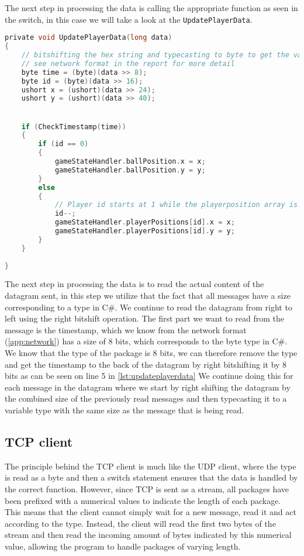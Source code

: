 The next step in processing the data is calling the appropriate function as seen in the switch, in this case we will take a look at the \texttt{UpdatePlayerData}.

\begin{lstlisting}[caption={Updating player data in UDP client}, captionpos=b,language=C,label={lst:updateplayerdata}]
private void UpdatePlayerData(long data)
{
    // bitshifting the hex string and typecasting to byte to get the values.
    // see network format in the report for more detail
    byte time = (byte)(data >> 8);
    byte id = (byte)(data >> 16);
    ushort x = (ushort)(data >> 24);
    ushort y = (ushort)(data >> 40);


    if (CheckTimestamp(time))
    {
        if (id == 0)
        {
            gameStateHandler.ballPosition.x = x;
            gameStateHandler.ballPosition.y = y;
        }
        else
        {
            // Player id starts at 1 while the playerposition array is 0 indexed. Decrementing id so that they line up.
            id--;
            gameStateHandler.playerPositions[id].x = x;
            gameStateHandler.playerPositions[id].y = y;
        }
    }
    
}
\end{lstlisting}

The next step in processing the data is to read the actual content of the datagram sent, in this step we utilize that the fact that all messages have a size corresponding to a type in C\#.
We continue to read the datagram from right to left using the right bitshift operation.
The first part we want to read from the message is the timestamp, which we know from the network format (\autoref{app:network}) has a size of 8 bits, which corresponds to the byte type in C\#.
We know that the type of the package is 8 bits, we can therefore remove the type and get the timestamp to the back of the datagram by right bitshifting it by 8 bits as can be seen on line 5 in \autoref{lst:updateplayerdata} 
We continue doing this for each message in the datagram where we start by right shifting the datagram by the combined size of the previously read messages and then typecasting it to a variable type with the same size as the message that is being read.
\subsection*{TCP client}
The principle behind the TCP client is much like the UDP client, where the type is read as a byte and then a switch statement ensures that the data is handled by the correct function.
However, since TCP is sent as a stream, all packages have been prefixed with a numerical values to indicate the length of each package.
This means that the client cannot simply wait for a new message, read it and act according to the type.
Instead, the client will read the first two bytes of the stream and then read the incoming amount of bytes indicated by this numerical value, allowing the program to handle packages of varying length.
